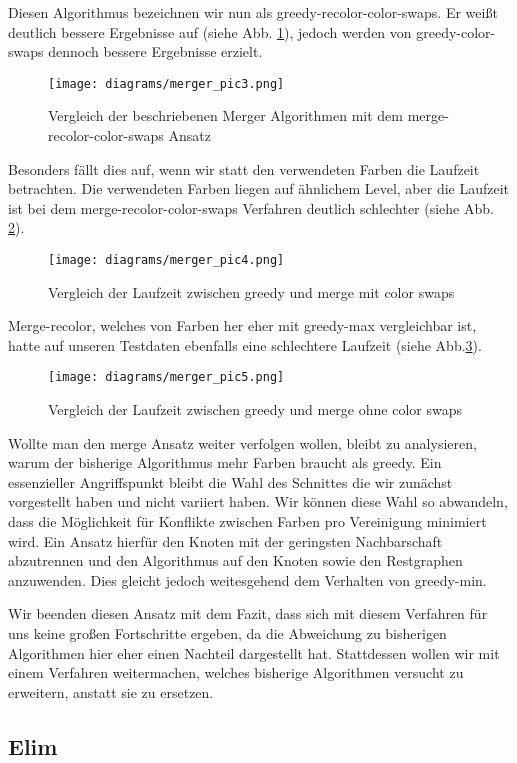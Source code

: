 \documentclass[11pt]{article}
\begin{document}
Diesen Algorithmus bezeichnen wir nun als greedy-recolor-color-swaps.
Er weißt deutlich bessere Ergebnisse auf (siehe Abb. \ref{fig:merge3}), jedoch werden von greedy-color-swaps dennoch bessere Ergebnisse erzielt.
\begin{figure}
  \texttt{[image: diagrams/merger\_pic3.png]}
  \caption{Vergleich der beschriebenen Merger Algorithmen mit dem merge-recolor-color-swaps Ansatz}
  \label{fig:merge3}
\end{figure}
Besonders fällt dies auf, wenn wir statt den verwendeten Farben die Laufzeit betrachten. Die verwendeten Farben liegen auf ähnlichem Level,
aber die Laufzeit ist bei dem merge-recolor-color-swaps Verfahren deutlich schlechter (siehe Abb. \ref{fig:merge4}).\\
\begin{figure}
  \texttt{[image: diagrams/merger\_pic4.png]}
  \caption{Vergleich der Laufzeit zwischen greedy und merge mit color swaps}
  \label{fig:merge4}
\end{figure}
Merge-recolor, welches von Farben her eher mit greedy-max vergleichbar ist, hatte auf unseren Testdaten ebenfalls eine schlechtere Laufzeit (siehe Abb.\ref{fig:merge5}).
\begin{figure}
  \texttt{[image: diagrams/merger\_pic5.png]}
  \caption{Vergleich der Laufzeit zwischen greedy und merge ohne color swaps}
  \label{fig:merge5}
\end{figure}

Wollte man den merge Ansatz weiter verfolgen wollen, bleibt zu analysieren, warum der bisherige Algorithmus mehr Farben braucht als greedy.
Ein essenzieller Angriffspunkt bleibt die Wahl des Schnittes die wir zunächst vorgestellt haben und nicht variiert haben.
Wir können diese Wahl so abwandeln, dass die Möglichkeit für Konflikte zwischen Farben pro Vereinigung minimiert wird.
Ein Ansatz hierfür den Knoten mit der geringsten Nachbarschaft abzutrennen und den Algorithmus auf den Knoten sowie den Restgraphen anzuwenden.
Dies gleicht jedoch weitesgehend dem Verhalten von greedy-min.

Wir beenden diesen Ansatz mit dem Fazit, dass sich mit diesem Verfahren für uns keine großen Fortschritte ergeben,
da die Abweichung zu bisherigen Algorithmen hier eher einen Nachteil dargestellt hat.
Stattdessen wollen wir mit einem Verfahren weitermachen, welches bisherige Algorithmen versucht zu erweitern, anstatt sie zu ersetzen.

\subsection{Elim}
\end{document}
